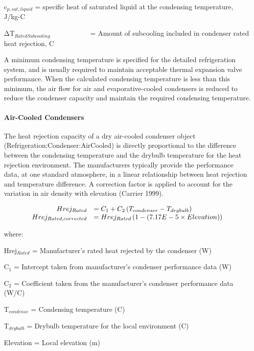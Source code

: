 c\(_{p,sat,liquid}\) = specific heat of saturated liquid at the condensing temperature, J/kg-C

ΔT\(_{RatedSubcooling}\)~~~~~~~~~~~ = Amount of subcooling included in condenser rated heat rejection, C

A minimum condensing temperature is specified for the detailed refrigeration system, and is usually required to maintain acceptable thermal expansion valve performance. When the calculated condensing temperature is less than this minimum, the air flow for air and evaporative-cooled condensers is reduced to reduce the condenser capacity and maintain the required condensing temperature.

\paragraph{Air-Cooled Condensers}\label{air-cooled-condensers}

The heat rejection capacity of a dry air-cooled condenser object (Refrigeration:Condenser:AirCooled) is directly proportional to the difference between the condensing temperature and the drybulb temperature for the heat rejection environment. The manufacturers typically provide the performance data, at one standard atmosphere, in a linear relationship between heat rejection and temperature difference. A correction factor is applied to account for the variation in air density with elevation (Carrier 1999).

\begin{equation}
  \begin{array}{rl}
    Hrej_{Rated} &= C_1 + C_2 \PB{T_{condenser} - T_{drybulb}} \\
    Hrej_{Rated,corrected} &= Hrej_{Rated} \PB{1 - \PB{7.17E-5 \times Elevation}}
  \end{array}
\end{equation}

where:

Hrej\(_{Rated}\) = Manufacturer's rated heat rejected by the condenser (W)

C\(_{1}\) = Intercept taken from manufacturer's condenser performance data (W)

C\(_{2}\) = Coefficient taken from the manufacturer's condenser performance data (W/C)

T\(_{condense}\) = Condensing temperature (C)

T\(_{drybulb}\) = Drybulb temperature for the local environment (C)

Elevation = Local elevation (m)


